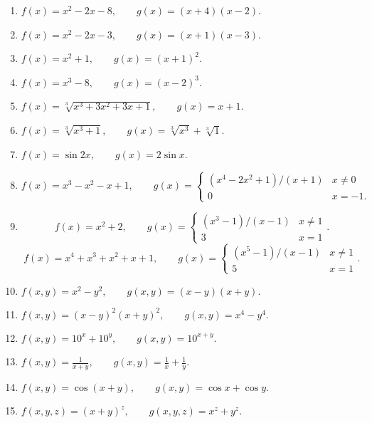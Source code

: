 \documentclass[12pt,a4paper]{article}
\newcommand{\vspaceC}{\vspace{2cm}}
\begin{document}
\begin{enumerate}
    \item $f(x) = x^2 - 2x - 8, \qquad g(x) = (x+4)(x-2)$.
    \vspaceC
    \item $f(x) = x^2 - 2x - 3, \qquad g(x) =  (x+1)(x-3)$.
    \vspaceC
    \item $f(x) = x^2 + 1, \qquad g(x) = (x + 1)^2$.
    \vspaceC
    \item $f(x) = x^3 - 8, \qquad g(x) =  (x-2)^3$.
    \vspaceC
    \item $f(x) = \sqrt[3]{x^3 + 3x^2 + 3x + 1}, \qquad g(x) = x + 1$.
    \vspaceC
    \item $f(x) = \sqrt[3]{x^3 + 1}, \qquad g(x) = \sqrt[3]{x^3} + \sqrt[3]{1}$.
    \vspaceC
    \item $f(x) = \sin 2x, \qquad g(x) = 2\sin x$.
    \vspaceC
    \item
       \[ f(x) = x^3 - x^2 - x + 1, \qquad g(x) = \begin{cases} 
          (x^4 - 2x^2 + 1)/(x+1) & x \ne 0 \\
          0 & x = -1.
       \end{cases}
    \]
        \vspaceC
    \item
       \[ f(x) = x^2 + 2, \qquad g(x) = \begin{cases} 
          (x^3 - 1)/(x-1) & x \ne 1 \\
          3 & x = 1
       \end{cases}.
    \]
\vspaceC
       \[ f(x) = x^4 + x^3 + x^2 + x + 1, \qquad g(x) = \begin{cases} 
          (x^5 - 1)/(x-1) & x \ne 1 \\
          5 & x = 1
       \end{cases}.
    \]
    \vspaceC
    \item $f(x,y) = x^2 - y^2, \qquad g(x,y) = (x-y)(x+y).$
    \vspaceC
    \item $f(x,y) = (x-y)^2(x+y)^2, \qquad g(x,y) = x^4 - y^4.$
            \vspaceC
    \item $f(x,y) = 10^x + 10^y, \qquad g(x,y) = 10^{x + y}$.
        \vspaceC
    \item $f(x,y) = \frac{1}{x+y}, \qquad g(x,y) = \frac{1}{x} + \frac{1}{y}.$
        \vspaceC
    \item $f(x,y) = \cos(x+y), \qquad g(x,y) = \cos x + \cos y.$
    \vspaceC
    \item $f(x,y,z) = (x + y)^z, \qquad g(x,y,z) = x^z + y^z.$
\end{enumerate}
\end{document}
